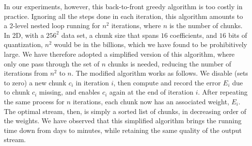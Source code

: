 In our experiments, however, this back-to-front greedy algorithm is too costly in practice. Ignoring
all the steps done in each iteration, this algorithm amounts to a 2-level nested loop running for
$n^2$ iterations, where $n$ is the number of chunks. In 2D, with a $256^2$ data set, a chunk size
that spans $16$ coefficients, and $16$ bits of quantization, $n^2$ would be in the billions, which
we have found to be prohibitively large. We have therefore adopted a simplified version of this
algorithm, where only one pass through the set of $n$ chunks is needed, reducing the number of
iterations from $n^2$ to $n$. The modified algorithm works as follows. We disable (sets to zero) a
new chunk $c_i$ in iteration $i$, then compute and record the error $E_i$ due to chunk $c_i$
missing, and enables $c_i$ again at the end of iteration $i$. After repeating the same process for
$n$ iterations, each chunk now has an associated weight, $E_i$. The optimal stream, then, is simply
a sorted list of chunks, in decreasing order of the weights. We have observed that this simplified
algorithm brings the running time down from days to minutes, while retaining the same quality of the
output stream.
